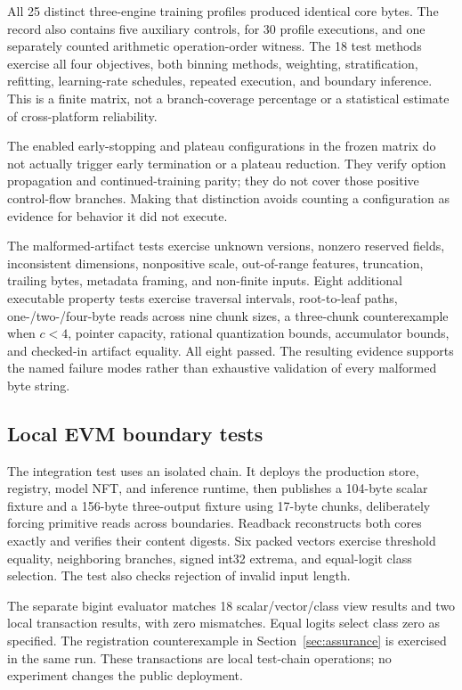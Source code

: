 \documentclass{ledger}
\begin{document}
All 25 distinct three-engine training profiles produced identical core bytes.
The record also contains five auxiliary controls, for 30 profile executions,
and one separately counted arithmetic operation-order witness. The 18 test
methods exercise all four objectives, both binning methods, weighting,
stratification, refitting, learning-rate schedules, repeated execution, and
boundary inference. This is a finite matrix, not a branch-coverage percentage
or a statistical estimate of cross-platform reliability.

The enabled early-stopping and plateau configurations in the frozen matrix
do not actually trigger early termination or a plateau reduction. They verify
option propagation and continued-training parity; they do not cover those
positive control-flow branches. Making that distinction avoids counting a
configuration as evidence for behavior it did not execute.

The malformed-artifact tests exercise unknown versions, nonzero reserved
fields, inconsistent dimensions, nonpositive scale, out-of-range features,
truncation, trailing bytes, metadata framing, and non-finite inputs. Eight
additional executable property tests exercise traversal intervals,
root-to-leaf paths, one-/two-/four-byte reads across nine chunk sizes,
a three-chunk counterexample when $c<4$, pointer capacity, rational
quantization bounds, accumulator bounds, and checked-in artifact equality.
All eight passed. The resulting evidence supports the named failure modes
rather than exhaustive validation of every malformed byte string.

\subsection{Local EVM boundary tests}

The integration test uses an isolated chain. It deploys the production
store, registry, model NFT, and inference runtime, then
publishes a 104-byte scalar fixture and a 156-byte three-output fixture using
17-byte chunks, deliberately forcing primitive reads across boundaries.
Readback reconstructs both cores exactly and verifies their content digests.
Six packed vectors exercise threshold equality, neighboring branches, signed
int32 extrema, and equal-logit class selection. The test also checks rejection
of invalid input length.

The separate bigint evaluator matches 18 scalar/vector/class view results and
two local transaction results, with zero mismatches. Equal logits select class
zero as specified. The registration counterexample in
Section~\ref{sec:assurance} is exercised in the same run. These transactions
are local test-chain operations; no experiment changes the public deployment.
\end{document}
